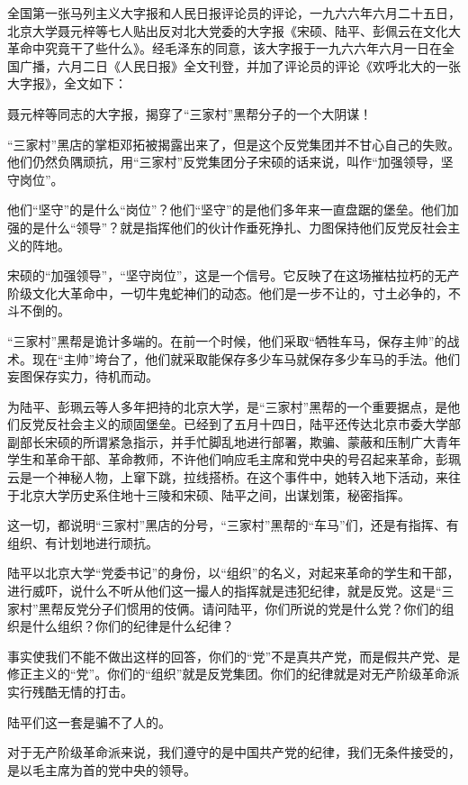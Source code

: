 \begin{maonote}
全国第一张马列主义大字报和人民日报评论员的评论，一九六六年六月二十五日，北京大学聂元梓等七人贴出反对北大党委的大字报《宋硕、陆平、彭佩云在文化大革命中究竟干了些什么》。经毛泽东的同意，该大字报于一九六六年六月一日在全国广播，六月二日《人民日报》全文刊登，并加了评论员的评论《欢呼北大的一张大字报》，全文如下：

聂元梓等同志的大字报，揭穿了“三家村”黑帮分子的一个大阴谋！

“三家村”黑店的掌柜邓拓被揭露出来了，但是这个反党集团并不甘心自己的失败。他们仍然负隅顽抗，用“三家村”反党集团分子宋硕的话来说，叫作“加强领导，坚守岗位”。

他们“坚守”的是什么“岗位”？他们“坚守”的是他们多年来一直盘踞的堡垒。他们加强的是什么“领导”？就是指挥他们的伙计作垂死挣扎、力图保持他们反党反社会主义的阵地。

宋硕的“加强领导”，“坚守岗位”，这是一个信号。它反映了在这场摧枯拉朽的无产阶级文化大革命中，一切牛鬼蛇神们的动态。他们是一步不让的，寸土必争的，不斗不倒的。

“三家村”黑帮是诡计多端的。在前一个时候，他们采取“牺牲车马，保存主帅”的战术。现在“主帅”垮台了，他们就采取能保存多少车马就保存多少车马的手法。他们妄图保存实力，待机而动。

为陆平、彭珮云等人多年把持的北京大学，是“三家村”黑帮的一个重要据点，是他们反党反社会主义的顽固堡垒。已经到了五月十四日，陆平还传达北京市委大学部副部长宋硕的所谓紧急指示，并手忙脚乱地进行部署，欺骗、蒙蔽和压制广大青年学生和革命干部、革命教师，不许他们响应毛主席和党中央的号召起来革命，彭珮云是一个神秘人物，上窜下跳，拉线搭桥。在这个事件中，她转入地下活动，来往于北京大学历史系住地十三陵和宋硕、陆平之间，出谋划策，秘密指挥。

这一切，都说明“三家村”黑店的分号，“三家村”黑帮的“车马”们，还是有指挥、有组织、有计划地进行顽抗。

陆平以北京大学“党委书记”的身份，以“组织”的名义，对起来革命的学生和干部，进行威吓，说什么不听从他们这一撮人的指挥就是违犯纪律，就是反党。这是“三家村”黑帮反党分子们惯用的伎俩。请问陆平，你们所说的党是什么党？你们的组织是什么组织？你们的纪律是什么纪律？

事实使我们不能不做出这样的回答，你们的“党”不是真共产党，而是假共产党、是修正主义的“党”。你们的“组织”就是反党集团。你们的纪律就是对无产阶级革命派实行残酷无情的打击。

陆平们这一套是骗不了人的。

对于无产阶级革命派来说，我们遵守的是中国共产党的纪律，我们无条件接受的，是以毛主席为首的党中央的领导。


\end{maonote}
